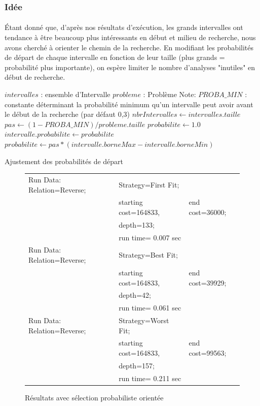 \documentclass[a4paper,10pt]{report}
\begin{document}
\subsubsection{Idée}

\paragraph{}
  Étant donné que, d'après nos résultats d'exécution, les grands intervalles ont
tendance à être beaucoup plus intéressants en début et milieu de recherche, nous
avons cherché à orienter le chemin de la recherche. En modifiant les
probabilités de départ de chaque intervalle en fonction de leur taille (plus
grands = probabilité plus importante), on espère limiter le nombre d'analyses
"inutiles" en début de recherche.


\begin{algorithm}
  \begin{algorithmic}
    \Require $intervalles$ : ensemble d'Intervalle
    \Require $probleme$ : Problème
    \State 
    \Comment Note: $PROBA\_MIN$ : constante déterminant la probabilité minimum qu'un
intervalle peut avoir avant le début de la recherche (par défaut 0,3)
    \State
    \State $nbrIntervalles \gets intervalles.taille$
    \State $pas \gets (1 - PROBA\_MIN) / probleme.taille$
    \State $probabilite \gets 1.0$
      \State $intervalle.probabilite \gets probabilite$
      \State $probabilite \gets pas * (intervalle.borneMax - intervalle.borneMin)$
    \EndFor
  \end{algorithmic}
  \caption{Ajustement des probabilités de départ}
\end{algorithm}


\begin{figure}[h]
 \begin{tabular}{lll}
  Run Data: Relation=Reverse;&
    Strategy=First Fit;\\
    &starting cost=164833,&
    end cost=36000;\\
    &depth=133;\\
    &run time= 0.007 sec\\
  Run Data: Relation=Reverse;&
    Strategy=Best Fit;\\
    &starting cost=164833,&
    end cost=39929;\\
    &depth=42;\\
    &run time= 0.061 sec\\
  Run Data: Relation=Reverse;&
    Strategy=Worst Fit;\\
    &starting cost=164833,&
    end cost=99563;\\
    &depth=157;\\
    &run time= 0.211 sec\\
 \end{tabular}
 \caption{Résultats avec sélection probabiliste orientée}
\end{figure}
\end{document}
